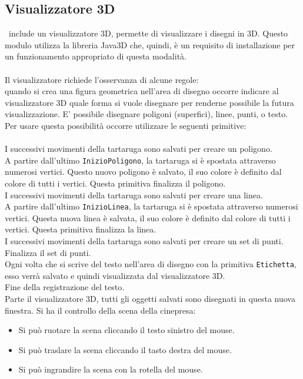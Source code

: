 \subsection{Visualizzatore 3D}
\xlogo\ include un visualizzatore 3D, permette di visualizzare i disegni in 3D. Questo modulo utilizza la libreria Java3D che, quindi, è un requisito di installazione per un funzionamento appropriato di questa modalità.\\ \\
Il visualizzatore richiede l'osservanza di alcune regole:\\
quando si crea una figura geometrica nell'area di disegno occorre indicare al visualizzatore 3D quale forma si vuole disegnare per renderne possibile la futura visualizzazione. E' possibile disegnare poligoni (superfici), linee, punti, o testo. Per usare questa possibilità occorre utilizzare le seguenti primitive:\\ \\
I successivi movimenti della tartaruga sono salvati per creare un poligono.\\
A partire dall'ultimo \texttt{InizioPoligono}, la tartaruga si è spostata attraverso numerosi vertici. Questo nuovo poligono è salvato, il suo colore è definito dal colore di tutti i vertici. Questa primitiva finalizza il poligono. \\
I successivi movimenti della tartaruga sono salvati per creare una linea. \\
A partire dall'ultimo \texttt{InizioLinea}, la tartaruga si è spostata attraverso numerosi vertici. Questa nuova linea è salvata, il suo colore è definito dal colore di tutti i vertici. Questa primitiva finalizza la linea. \\
I successivi movimenti della tartaruga sono salvati per creare un set di punti. \\
Finalizza il set di punti.\\
Ogni volta che si scrive del testo nell'area di disegno con la primitiva \texttt{Etichetta}, esso verrà salvato e quindi visualizzata dal visualizzatore 3D.\\
Fine della registrazione del testo.\\
Parte il visualizzatore 3D, tutti gli oggetti salvati sono disegnati in questa nuova finestra. Si ha il controllo della scena della cinepresa:
\begin{itemize}
	\item Si può ruotare la scena cliccando il testo sinistro del mouse.
	\item Si può traslare la scena cliccando il tasto destra del mouse.
	\item Si può ingrandire la scena con la rotella del mouse.
\end{itemize}
